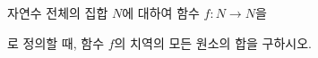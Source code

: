 자연수 전체의 집합 $N$에 대하여 함수 $f:N\longrightarrow N$을 \par\smallskip{}\par\smallskip\noindent 로 정의할 때, 함수 $f$의 치역의 모든 원소의 합을 구하시오.
